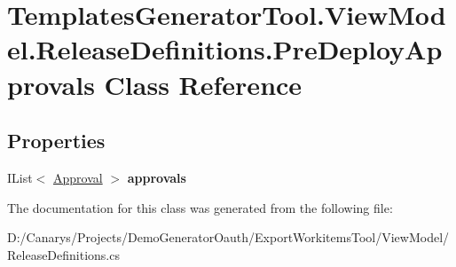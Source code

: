 \hypertarget{class_templates_generator_tool_1_1_view_model_1_1_release_definitions_1_1_pre_deploy_approvals}{}\section{Templates\+Generator\+Tool.\+View\+Model.\+Release\+Definitions.\+Pre\+Deploy\+Approvals Class Reference}
\label{class_templates_generator_tool_1_1_view_model_1_1_release_definitions_1_1_pre_deploy_approvals}
\subsection*{Properties}
\begin{DoxyCompactItemize}
\item 
\mbox{\label{class_templates_generator_tool_1_1_view_model_1_1_release_definitions_1_1_pre_deploy_approvals_add3c6cde94fb0bfbf0691853ddf0ca9e}} 
I\+List$<$ \mbox{\hyperlink{class_templates_generator_tool_1_1_view_model_1_1_release_definitions_1_1_approval}{Approval}} $>$ {\bfseries approvals}
\end{DoxyCompactItemize}


The documentation for this class was generated from the following file\+:\begin{DoxyCompactItemize}
\item 
D\+:/\+Canarys/\+Projects/\+Demo\+Generator\+Oauth/\+Export\+Workitems\+Tool/\+View\+Model/Release\+Definitions.\+cs\end{DoxyCompactItemize}
